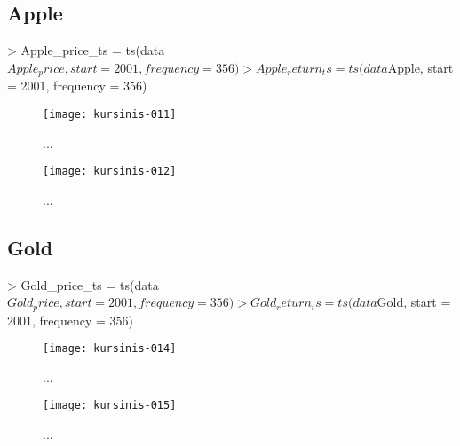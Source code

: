 \documentclass[12pt, a14paper, lithuanian]{article}
\begin{document}
\subsection{Apple}
\begin{Schunk}
\begin{Sinput}
> Apple_price_ts = ts(data$Apple_price, start = 2001, frequency = 356)
> Apple_return_ts = ts(data$Apple, start = 2001, frequency = 356)
\end{Sinput}
\end{Schunk}
\begin{figure}[H]
  \centering
\texttt{[image: kursinis-011]}
  \caption{...}
  \label{fig:6}
\end{figure}
\begin{figure}[H]
  \centering
\texttt{[image: kursinis-012]}
  \caption{...}
  \label{fig:7}
\end{figure}
             

\subsection{Gold}
\begin{Schunk}
\begin{Sinput}
> Gold_price_ts = ts(data$Gold_price, start = 2001, frequency = 356)
> Gold_return_ts = ts(data$Gold, start = 2001, frequency = 356)
\end{Sinput}
\end{Schunk}
\begin{figure}[H]
  \centering
\texttt{[image: kursinis-014]}
  \caption{...}
  \label{fig:8}
\end{figure}
\begin{figure}[H]
  \centering
\texttt{[image: kursinis-015]}
  \caption{...}
  \label{fig:9}
\end{figure}
             
\end{document}
